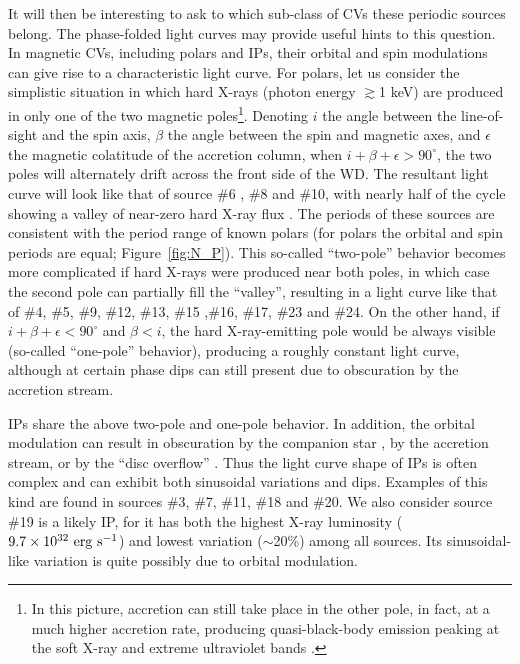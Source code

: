 \documentclass[fleqn,usenatbib]{mnras}
\begin{document}
It will then be interesting to ask to which sub-class of CVs these periodic sources belong. The phase-folded light curves may provide useful hints to this question. 
In magnetic CVs, including polars and IPs, their orbital and spin modulations can give rise to a characteristic light curve. For polars, let us consider the simplistic situation in which hard X-rays (photon energy $\gtrsim$1 keV) are produced in only one of the two magnetic poles\footnote{In this picture, accretion can still take place in the other pole, in fact, at a much higher accretion rate, producing quasi-black-body emission peaking at the soft X-ray and extreme ultraviolet bands \citep{2001cvs..book.....H}.}.
Denoting $i$ the angle between the line-of-sight and the spin axis, $\beta$ the angle between the spin and magnetic axes, and $\epsilon$ the magnetic colatitude of the accretion column, when $i+\beta+\epsilon > 90^{\circ}$, the two poles will alternately drift across the front side of the WD. 
The resultant light curve will look like that of source \#6 , \#8 and \#10, with nearly half of the cycle showing a valley of near-zero hard X-ray flux \citep{1985A&A...148L..14H}. 
The periods of these sources are consistent with the period range of known polars (for polars the orbital and spin periods are equal; Figure~\ref{fig:N_P}).
This so-called ``two-pole'' behavior becomes more complicated if hard X-rays were produced near both poles, in which case the second pole can partially fill the ``valley'', resulting in a light curve like that of \#4, \#5, \#9, \#12, \#13, \#15 ,\#16, \#17, \#23 and \#24. 
On the other hand, if $i+\beta+\epsilon < 90^{\circ}$ and $\beta < i$, the hard X-ray-emitting pole would be always visible (so-called ``one-pole'' behavior), producing a roughly constant light curve, although at certain phase dips can still present due to obscuration by the accretion stream.

IPs share the above two-pole and one-pole behavior. 
In addition, the orbital modulation can result in obscuration by the companion star \citep{1993MNRAS.260..299H}, by the accretion stream, or by the ``disc overflow'' \citep{1996MNRAS.280..937N}. 
Thus the light curve shape of IPs is often complex and can exhibit both sinusoidal variations and dips. Examples of this kind are found in sources \#3, \#7, \#11, \#18 and \#20.
We also consider source \#19 is a likely IP, for it has both the highest X-ray luminosity ($9.7\times10^{32}{\rm~erg~s^{-1}}$) and lowest variation ($\sim$20\%) among all sources. Its sinusoidal-like variation is quite possibly due to orbital modulation.
\end{document}
